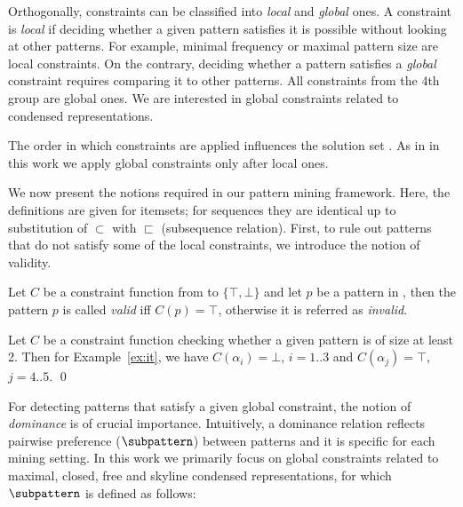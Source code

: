 Orthogonally, constraints can be classified into \emph{local} and \emph{global} ones.  
A constraint is \emph{local} if deciding whether a given pattern satisfies it is possible without looking at other patterns. For example, minimal frequency or maximal pattern %
size are local constraints. On the contrary, deciding whether a pattern satisfies a \emph{global} constraint requires comparing it to other patterns. All constraints from the 4th group are global ones. We are interested in global constraints related to condensed representations. 

The order in which constraints are applied influences the solution set \parencite{DBLP:journals/kais/BonchiL06}. %
As in \parencite{DBLP:journals/kais/BonchiL06} in this work we %
apply %
global constraints only after local ones.

We now present the notions required in our pattern mining framework. Here, the definitions are given for itemsets; for sequences they are identical up to substitution of $\subset$ with $\sqsubset$ (subsequence relation). First, to rule out patterns that do not satisfy some of the local constraints, we introduce the notion of validity.

\begin{definition}\label{def:val}
  Let $C$ be a constraint function from \patternspace to $\{ \top, \bot \}$ and let $p$ be a pattern in \patternspace, then the pattern $p$ is called \emph{valid} iff $C(p) = \top$, otherwise it is referred as \emph{invalid}.
\end{definition}


\begin{example}\label{ex:valid}
Let $C$ be a constraint function checking whether a given pattern is of size %
at least 2. Then for Example~\ref{ex:it}, we have $C(\alpha_i)=\bot$, $i=1..3$ and $C(\alpha_j)=\top$, $j=4..5$. \qed
\end{example}

For detecting patterns that satisfy a given global constraint, the notion of \emph{dominance} is of crucial importance. Intuitively, a dominance relation reflects pairwise preference ($\subpattern$)
between patterns and it is specific for each mining setting.  In this work we primarily focus on global constraints related to maximal, closed, free and skyline condensed representations, for which $\subpattern$ is defined as follows:

